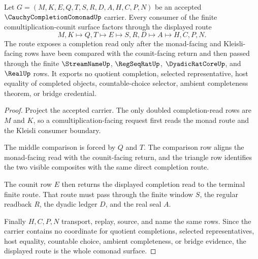 \begin{theorem}
\label{thm:cauchy-completion-comonad-comultiplication-counit-route}
Let $G=(M,K,E,Q,T,S,R,D,A,H,C,P,N)$ be an accepted $\CauchyCompletionComonadUp$ carrier. Every consumer of the finite comultiplication-counit surface factors through the displayed route
$$
M,K \longmapsto Q,T \longmapsto E \longmapsto S,R,D \longmapsto A \longmapsto H,C,P,N .
$$
The route exposes a completion read only after the monad-facing and Kleisli-facing rows have been compared with the counit-facing return and then passed through the finite $\StreamNameUp$, $\RegSeqRatUp$, $\DyadicRatCoreUp$, and $\RealUp$ rows. It exports no quotient completion, selected representative, host equality of completed objects, countable-choice selector, ambient completeness theorem, or bridge credential.
\end{theorem}
\begin{proof}
Project the accepted carrier. The only doubled completion-read rows are $M$ and $K$, so a comultiplication-facing request first reads the monad route and the Kleisli consumer boundary.

The middle comparison is forced by $Q$ and $T$. The comparison row aligns the monad-facing read with the counit-facing return, and the triangle row identifies the two visible composites with the same direct completion route.

The counit row $E$ then returns the displayed completion read to the terminal finite route. That route must pass through the finite window $S$, the regular readback $R$, the dyadic ledger $D$, and the real seal $A$.

Finally $H,C,P,N$ transport, replay, source, and name the same rows. Since the carrier contains no coordinate for quotient completions, selected representatives, host equality, countable choice, ambient completeness, or bridge evidence, the displayed route is the whole comonad surface.
\end{proof}

